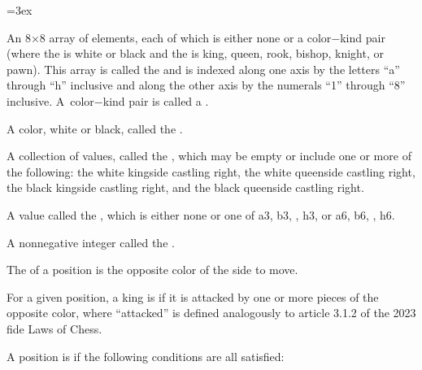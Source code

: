 {\leftskip=3ex

\parskip An 8×8 array of elements, each of which is either
{\caps none} or a color−\allowbreak kind pair (where the  is white
or black and the  is king, queen, rook, bishop, knight, or pawn).
This array is called the  and is indexed along one axis by the
letters “a” through “h” inclusive and along the other axis by the numerals
“1” through “8” inclusive. A~color−\allowbreak kind pair is called a
.

\parskip A color, white or black, called the .

\parskip A collection of values, called the , which may
be empty or include one or more of the following: the white kingside castling
right, the white queenside castling right, the black kingside castling right,
and the black queenside castling right.

\parskip A value called the , which is either
{\caps none} or one of a3, b3, \ellipsis\ot, h3, or a6, b6, \ellipsis\ot, h6.

\parskip A nonnegative integer called the .

}

\parskip The  of a position is the opposite color
of the side to move.

\minor For a given position, a king is  if it is attacked by one
or more pieces of the opposite color, where “attacked” is defined analogously to
article 3.1.2 of the 2023 {\caps fide} Laws of Chess.

\minor A position is  if the following conditions are all satisfied:


